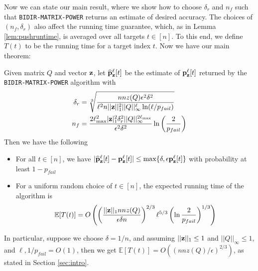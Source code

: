 Now we can state our main result, where we show how to choose $\delta_r$ and $n_f$ such that \texttt{BIDIR-MATRIX-POWER} returns an estimate of desired accuracy. 
The choices of $(n_f,\delta_r)$ also affect the running time guarantee, which, as in Lemma \ref{lem:pushruntime}, is averaged over all targets $t\in[n]$. 
To this end, we define $T(t)$ to be the running time for a target index $t$. 
Now we have our main theorem:
\begin{theorem}
\label{thm:main}
Given matrix $Q$ and vector $\mathbf{z}$, let $\widehat{\mathbf{p}}_\mathbf{z}^{\ell}[t]$ be the estimate of ${\mathbf{p}}_\mathbf{z}^{\ell}[t]$ returned by the \texttt{BIDIR-MATRIX-POWER} algorithm with 
\begin{align*}
\delta_r &= \sqrt[3]{\frac{nnz(Q) \epsilon^2\delta^2}{\ell^2 n||\mathbf{z}||_1^2||Q||_{\infty}^{\ell}\ln(\ell/p_{fail}) } }\\
n_f &= \frac{2 \ell_{\max}^2|\mathbf{z}|_1^2 \delta_r^2 ||Q||_{\infty}^{2\ell_{\max}}}{\epsilon^2\delta^2}\ln \left(\frac{2}{p_{fail}}\right)
\end{align*}
Then we have the following
\begin{itemize}
\item For all $t\in[n]$, we have $|\widehat{\mathbf{p}}_\mathbf{z}^{\ell}[t]-{\mathbf{p}}_\mathbf{z}^{\ell}[t]|\leq \max\{\delta,\epsilon{\mathbf{p}}_\mathbf{z}^{\ell}[t]\}$ with probability at least $1-p_{fail}$ 
\item For a uniform random choice of $t\in[n]$, the expected running time of the algorithm is
$$
\mathbb{E}[T(t)] = O\left( \left(\frac{||\mathbf{z}||_1 nnz(Q)}{\epsilon \delta n} \right)^{2/3} \ell^{5/3}\left(\ln \frac{2}{p_{fail}} \right)^{1/3} \right)$$
\end{itemize}
\end{theorem}

In particular, suppose we choose $\delta = 1/n$, and assuming $||\mathbf{z}||_1\leq 1$ and $||Q||_{\infty}\leq 1$, and $\ell,1/p_{fail}=O(1)$, then we get $\mathbb{E}[T(t)] = O\left(\left(nnz(Q)/\epsilon\right)^{2/3}\right)$, as stated in Section \ref{sec:intro}.

